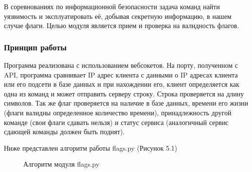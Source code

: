 В соревнованиях по информационной безопасности задача команд найти уязвимость и эксплуатировать её, добывая секретную информацию, в нашем случае флаги. Целью модуля является прием и проверка на валидность флагов.

\subsubsection{Принцип работы}

Программа реализована с использованием вебсокетов. На порту, полученном с API, программа сравнивает IP адрес клиента с данными о IP адресах клиента или его подсети в базе данных и при нахождении его, клиент определяется как одна из команд и может отправить серверу строку. Строка проверяется на длину символов. Так же флаг проверяется на наличие в базе данных, времени его жизни (флаги валидны определенное количество времени), принадлежность другой команде (свои флаги сдавать нельзя) и статус сервиса (аналогичный сервис сдающей команды должен быть поднят). 

Ниже представлен алгоритм работы flags.py (Рисунок 5.1)

\begin{figure}[ht!]
\caption{Алгоритм модуля flags.py}
\end{figure} 

\clearpage
